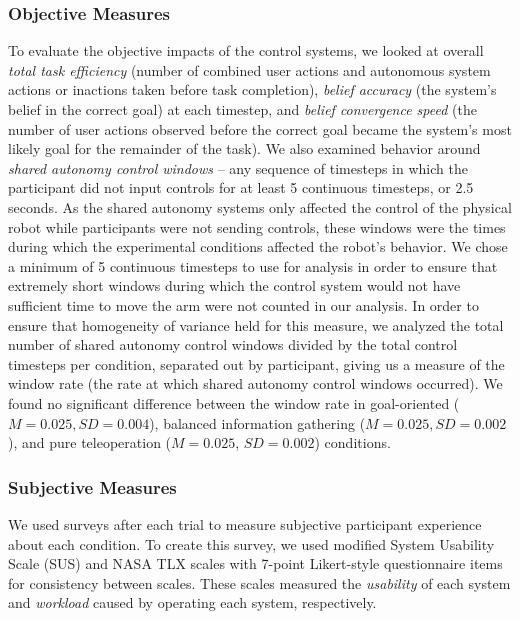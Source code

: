 \documentclass[conference]{IEEEtran}
\begin{document}
\subsubsection{Objective Measures}
To evaluate the objective impacts of the control systems, we looked at overall \textit{total task efficiency} (number of combined user actions and autonomous system actions or inactions taken before task completion), \textit{belief accuracy} (the system's belief in the correct goal) at each timestep, and \textit{belief convergence speed} (the number of user actions observed before the correct goal became the system's most likely goal for the remainder of the task). We also examined behavior around \textit{shared autonomy control windows} -- any sequence of timesteps in which the participant did not input controls for at least 5 continuous timesteps, or 2.5 seconds. As the shared autonomy systems only affected the control of the physical robot while participants were not sending controls, these windows were the times during which the experimental conditions affected the robot's behavior. We chose a minimum of 5 continuous timesteps to use for analysis in order to ensure that extremely short windows during which the control system would not have sufficient time to move the arm were not counted in our analysis. In order to ensure that homogeneity of variance held for this measure, we analyzed the total number of shared autonomy control windows divided by the total control timesteps per condition, separated out by participant, giving us a measure of the window rate (the rate at which shared autonomy control windows occurred). We found no significant difference between the window rate in goal-oriented ($M = 0.025, SD = 0.004$), balanced information gathering ($M = 0.025, SD = 0.002$), and pure teleoperation ($M = 0.025$, $SD = 0.002$) conditions.

\subsubsection{Subjective Measures}

We used surveys after each trial to measure subjective participant experience about each condition. To create this survey, we used modified System Usability Scale (SUS) and NASA TLX scales with 7-point Likert-style questionnaire items for consistency between scales. These scales measured the \textit{usability} of each system and \textit{workload} caused by operating each system, respectively.

%
%
\end{document}
